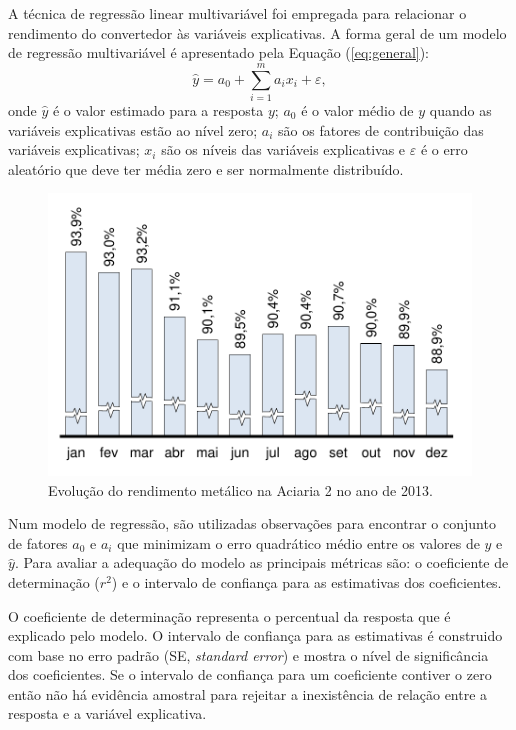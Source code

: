 \begin{multicols}{2}
	A técnica de regressão linear multivariável\cite{wiki:reglin} foi empregada para relacionar o rendimento do convertedor às variáveis explicativas. A forma geral de um modelo de regressão multivariável é apresentado pela Equação (\ref{eq:general}):
	\begin{equation}
		\label{eq:general}
		\hat{y} = a_0 + \sum_{i=1}^m a_i x_i + \varepsilon,		
	\end{equation}
	\noindent onde $\hat{y}$ é o valor estimado para a resposta $y$; $a_0$ é o valor médio de $y$ quando as variáveis explicativas estão ao nível zero; $a_i$ são os fatores de contribuição das variáveis explicativas; $x_i$ são os níveis das variáveis explicativas e $\varepsilon$ é o erro aleatório que deve ter média zero e ser normalmente distribuído.
	\begin{figure}[H]
		\centering
		\includegraphics[scale=0.55, bb=0 0 432 288, trim=0in 0in 0in 0in]{figures/fig02-excel.pdf} %
		\caption{Evolução do rendimento metálico na Aciaria 2 no ano de 2013\cite{rel2}.}
		\label{fig:evol_rend}
	\end{figure}		
	Num modelo de regressão, são utilizadas observações para encontrar o conjunto de fatores $a_0$ e $a_i$ que minimizam o erro quadrático médio entre os valores de $y$ e $\hat{y}$. Para avaliar a adequação do modelo as principais métricas são: o coeficiente de determinação ($r^2$) e o intervalo de confiança para as estimativas dos coeficientes. 
	
	O coeficiente de determinação representa o percentual da resposta que é explicado pelo modelo. O intervalo de confiança para as estimativas é construido com base no erro padrão (SE, \textit{standard error}) e mostra o nível de significância dos coeficientes. Se o intervalo de confiança para um coeficiente contiver o zero então não há evidência amostral para rejeitar a inexistência de relação entre a resposta e a variável explicativa.
	

\end{multicols}
